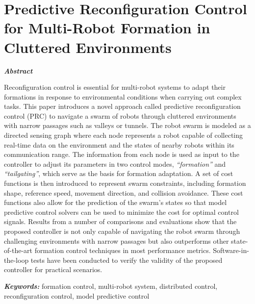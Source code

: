 \chapter{Predictive Reconfiguration Control for Multi-Robot Formation in Cluttered Environments}\label{paper3}

\vspace{1cm}

\noindent\textit{\textbf{Abstract}}

Reconfiguration control is essential for multi-robot systems to adapt their formations in response to environmental conditions when carrying out complex tasks. This paper introduces a novel approach called predictive reconfiguration control (PRC) to navigate a swarm of robots through cluttered environments with narrow passages such as valleys or tunnels. The robot swarm is modeled as a directed sensing graph where each node represents a robot capable of collecting real-time data on the environment and the states of nearby robots within its communication range. The information from each node is used as input to the controller to adjust its parameters in two control modes, \textit{``formation''} and \textit{``tailgating''}, which serve as the basis for formation adaptation. A set of cost functions is then introduced to represent swarm constraints, including formation shape, reference speed, movement direction, and collision avoidance. These cost functions also allow for the prediction of the swarm's states so that model predictive control solvers can be used to minimize the cost for optimal control signals. Results from a number of comparisons and evaluations show that the proposed controller is not only capable of navigating the robot swarm through challenging environments with narrow passages but also outperforms other state-of-the-art formation control techniques in most performance metrics. Software-in-the-loop tests have been conducted to verify the validity of the proposed controller for practical scenarios.

\noindent\textbf{\textit{Keywords:}}
formation control, multi-robot system, distributed control, reconfiguration control, model predictive control







